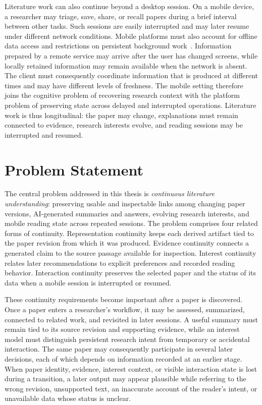 Literature work can also continue beyond a desktop session.
On a mobile device, a researcher may triage, save, share, or recall papers during a brief interval between other tasks.
Such sessions are easily interrupted and may later resume under different network conditions.
Mobile platforms must also account for offline data access and restrictions on persistent background work~\cite{androidOfflineFirst2026,androidWorkManager2026}.
Information prepared by a remote service may arrive after the user has changed screens, while locally retained information may remain available when the network is absent.
The client must consequently coordinate information that is produced at different times and may have different levels of freshness.
The mobile setting therefore joins the cognitive problem of recovering research context with the platform problem of preserving state across delayed and interrupted operations.
Literature work is thus longitudinal: the paper may change, explanations must remain connected to evidence, research interests evolve, and reading sessions may be interrupted and resumed.

\section{Problem Statement}

The central problem addressed in this thesis is \emph{continuous literature understanding}: preserving usable and inspectable links among changing paper versions, AI-generated summaries and answers, evolving research interests, and mobile reading state across repeated sessions.
The problem comprises four related forms of continuity.
Representation continuity keeps each derived artifact tied to the paper revision from which it was produced.
Evidence continuity connects a generated claim to the source passage available for inspection.
Interest continuity relates later recommendations to explicit preferences and recorded reading behavior.
Interaction continuity preserves the selected paper and the status of its data when a mobile session is interrupted or resumed.

These continuity requirements become important after a paper is discovered.
Once a paper enters a researcher's workflow, it may be assessed, summarized, connected to related work, and revisited in later sessions.
A useful summary must remain tied to its source revision and supporting evidence, while an interest model must distinguish persistent research intent from temporary or accidental interaction.
The same paper may consequently participate in several later decisions, each of which depends on information recorded at an earlier stage.
When paper identity, evidence, interest context, or visible interaction state is lost during a transition, a later output may appear plausible while referring to the wrong revision, unsupported text, an inaccurate account of the reader's intent, or unavailable data whose status is unclear.

